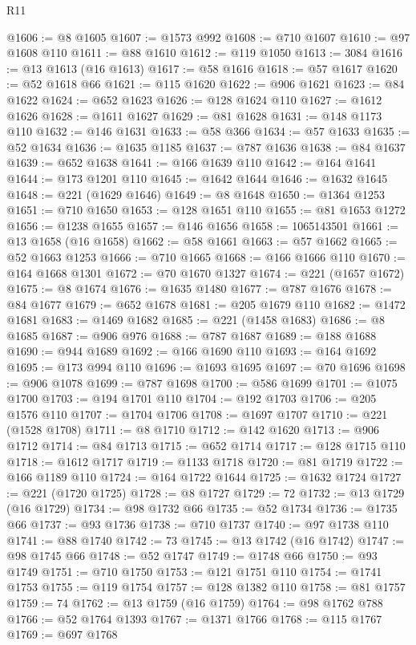 \begin{lexlean}{R11}
\begin{coremodule}
@1606 := @8 @1605
@1607 := @1573 @992
@1608 := @710 @1607
@1610 := @97 @1608 @110
@1611 := @88 @1610
@1612 := @119 @1050
@1613 := 3084
@1616 := @13 @1613 (@16 @1613)
@1617 := @58 @1616
@1618 := @57 @1617
@1620 := @52 @1618 @66
@1621 := @115 @1620
@1622 := @906 @1621
@1623 := @84 @1622
@1624 := @652 @1623
@1626 := @128 @1624 @110
@1627 := @1612 @1626
@1628 := @1611 @1627
@1629 := @81 @1628
@1631 := @148 @1173 @110
@1632 := @146 @1631
@1633 := @58 @366
@1634 := @57 @1633
@1635 := @52 @1634
@1636 := @1635 @1185
@1637 := @787 @1636
@1638 := @84 @1637
@1639 := @652 @1638
@1641 := @166 @1639 @110
@1642 := @164 @1641
@1644 := @173 @1201 @110
@1645 := @1642 @1644
@1646 := @1632 @1645
@1648 := @221 (@1629 @1646)
@1649 := @8 @1648
@1650 := @1364 @1253
@1651 := @710 @1650
@1653 := @128 @1651 @110
@1655 := @81 @1653 @1272
@1656 := @1238 @1655
@1657 := @146 @1656
@1658 := 1065143501
@1661 := @13 @1658 (@16 @1658)
@1662 := @58 @1661
@1663 := @57 @1662
@1665 := @52 @1663 @1253
@1666 := @710 @1665
@1668 := @166 @1666 @110
@1670 := @164 @1668 @1301
@1672 := @70 @1670 @1327
@1674 := @221 (@1657 @1672)
@1675 := @8 @1674
@1676 := @1635 @1480
@1677 := @787 @1676
@1678 := @84 @1677
@1679 := @652 @1678
@1681 := @205 @1679 @110
@1682 := @1472 @1681
@1683 := @1469 @1682
@1685 := @221 (@1458 @1683)
@1686 := @8 @1685
@1687 := @906 @976
@1688 := @787 @1687
@1689 := @188 @1688
@1690 := @944 @1689
@1692 := @166 @1690 @110
@1693 := @164 @1692
@1695 := @173 @994 @110
@1696 := @1693 @1695
@1697 := @70 @1696
@1698 := @906 @1078
@1699 := @787 @1698
@1700 := @586 @1699
@1701 := @1075 @1700
@1703 := @194 @1701 @110
@1704 := @192 @1703
@1706 := @205 @1576 @110
@1707 := @1704 @1706
@1708 := @1697 @1707
@1710 := @221 (@1528 @1708)
@1711 := @8 @1710
@1712 := @142 @1620
@1713 := @906 @1712
@1714 := @84 @1713
@1715 := @652 @1714
@1717 := @128 @1715 @110
@1718 := @1612 @1717
@1719 := @1133 @1718
@1720 := @81 @1719
@1722 := @166 @1189 @110
@1724 := @164 @1722 @1644
@1725 := @1632 @1724
@1727 := @221 (@1720 @1725)
@1728 := @8 @1727
@1729 := 72
@1732 := @13 @1729 (@16 @1729)
@1734 := @98 @1732 @66
@1735 := @52 @1734
@1736 := @1735 @66
@1737 := @93 @1736
@1738 := @710 @1737
@1740 := @97 @1738 @110
@1741 := @88 @1740
@1742 := 73
@1745 := @13 @1742 (@16 @1742)
@1747 := @98 @1745 @66
@1748 := @52 @1747
@1749 := @1748 @66
@1750 := @93 @1749
@1751 := @710 @1750
@1753 := @121 @1751 @110
@1754 := @1741 @1753
@1755 := @119 @1754
@1757 := @128 @1382 @110
@1758 := @81 @1757
@1759 := 74
@1762 := @13 @1759 (@16 @1759)
@1764 := @98 @1762 @788
@1766 := @52 @1764 @1393
@1767 := @1371 @1766
@1768 := @115 @1767
@1769 := @697 @1768

\end{coremodule}
\end{lexlean}
